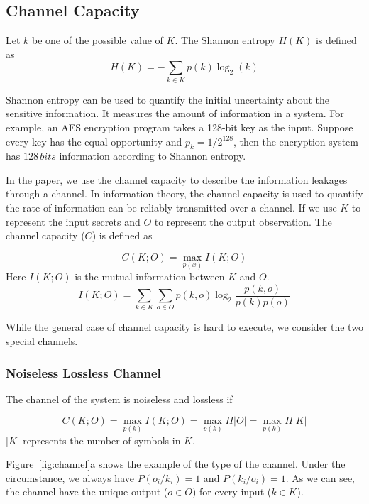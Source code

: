 \subsection{Channel Capacity}
Let $k$ be one of the possible
value of $K$. The Shannon entropy $H(K)$ is defined as
\begin{equation}\label{eq1}
    H(K) = - \sum_{k {\in} K}p(k)\log_2(k)
\end{equation}

Shannon entropy can be used to quantify the initial uncertainty about the sensitive information. It measures the amount of information in a system. For example, an AES encryption program takes a 128-bit key as the input. Suppose every key has the equal opportunity and $p_k = 1/ 2^{128}$, then the encryption system has $128 \, \mathit{bits}$ information according to Shannon entropy. 


In the paper, we use the channel capacity to describe the information leakages through a channel. In information theory, the channel capacity is used to quantify the rate of information can be reliably transmitted over a channel. If we use $K$ to represent the input secrets and $O$ to represent the output observation. The channel capacity ($C$) is defined as 

\begin{equation}\label{eq2}
C(K;O) = \max_{p(x)} I(K;O)
\end{equation}
Here $I(K;O)$ is the mutual information between $K$ and $O$.  
\begin{equation} \label{eq3}
    I(K;O) = \sum_{k {\in} K}{\sum_{o {\in} O}{p(k, o)\log_2\frac{p(k, o)}{p(k)p(o)}}}
\end{equation}

While the general case of channel capacity is hard to execute, we consider the two special channels.

\subsubsection{Noiseless Lossless Channel}
The channel of the system is noiseless and lossless if

\begin{equation} \label{eq:1}
    C(K;O) = \max_{p(k)} I(K;O) = \max_{p(k)} H|O| =\max_{p(k)} H|K|
\end{equation}
$|K|$ represents the number of symbols in $K$. 

Figure~\ref{fig:channel}a shows the example of the type of the channel. Under the circumstance, we always have $P(o_i/k_i) = 1$ and $P(k_i/o_i) = 1$. As we can see, the channel have the unique output ($o \in O$) for every input ($k \in K$). 

